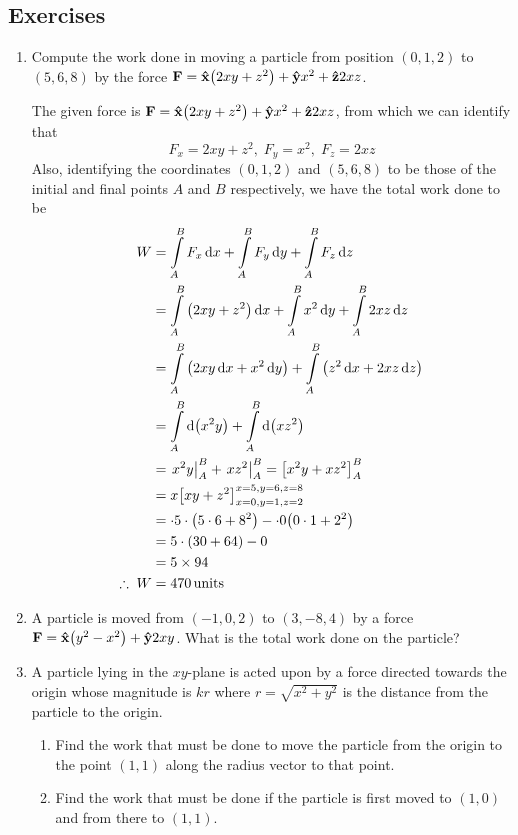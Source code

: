 	\newpage
	\subsection*{Exercises}
		\begin{enumerate}
			\item Compute the work done in moving a particle from position $(0,1,2)$ to $(5,6,8)$ by the force $\vb{F}=\vu{x}\qty(2xy+z^2) + \vu{y}x^2 + \vu{z}2xz$.
			\begin{solution}
				The given force is $\vb{F}=\vu{x}\qty(2xy+z^2) + \vu{y}x^2 + \vu{z}2xz$, from which we can identify that
				$$F_x=2xy+z^2,\;F_y=x^2,\;F_z=2xz$$
				Also, identifying the coordinates $(0,1,2)$ and $(5,6,8)$ to be those of the initial and final points $A$ and $B$ respectively, we have
				the total work done to be
				\begin{align*}
					W&=\int\limits_{A}^{B}{F_x\dd{x}} + \int\limits_{A}^{B}{F_y\dd{y}} + \int\limits_{A}^{B}{F_z\dd{z}} \\
					&=\int\limits_{A}^{B}{\qty(2xy+z^2)\dd{x}} + \int\limits_{A}^{B}{x^2\dd{y}} + \int\limits_{A}^{B}{2xz\dd{z}} \\
					&=\int\limits_{A}^{B}{\qty(2xy\dd{x}+x^2\dd{y})} + \int\limits_{A}^{B}{\qty(z^2\dd{x}+2xz\dd{z})} \\
					&=\int\limits_{A}^{B}{\dd{\qty(x^2y)}} + \int\limits_{A}^{B}{\dd{\qty(xz^2)}} \\
					&=\left. x^2y \right|_{A}^{B} + \left. xz^2 \right|_{A}^{B} =\qty[x^2y + xz^2]_{A}^{B} \\
					&=x\qty[xy + z^2]_{x=0,y=1,z=2}^{x=5,y=6,z=8} \\
					&=\cdot5\cdot\qty(5\cdot6+8^2)-\cdot0\qty(0\cdot1+2^2) \\
					&=5\cdot\qty(30+64) - 0\\
					&=5\times94 \\
					\therefore\; W&=470\,\text{units}
				\end{align*}
			\end{solution}
			
			\item A particle is moved from $(-1,0,2)$ to $(3,-8,4)$ by a force $\vb{F}=\vu{x}\qty(y^2-x^2) + \vu{y}2xy$. What is the total work done on the particle?
			
			\item A particle lying in the $xy$-plane is acted upon by a force directed towards the origin whose magnitude is $kr$ where $r=\sqrt{x^2+y^2}$ is the distance from the particle to the origin.
			\begin{enumerate}
				\item Find the work that must be done to move the particle from the origin to the point $(1,1)$ along the radius vector to that point.
				\item Find the work that must be done if the particle is first moved to $(1,0)$ and from there to $(1,1)$.
			\end{enumerate}
		\end{enumerate}